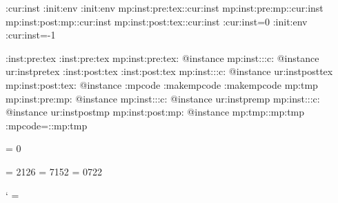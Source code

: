 \protected\def\newmetapostinstance{\withoptions[]\newmetapostinstance:}
\def\newmetapostinstance:[#1]#2{%
    \chardef#2=\directlua{
            tex.sprint(require('minim-mp').open{#1})
        }\relax}

\newcount \mp:cur:inst
\newtoks \mp:init:env \mp:init:env{%
    \expandafter\newtoks\csname mp:inst:pre:tex:\the\mp:cur:inst\endcsname
    \expandafter\newtoks\csname mp:inst:pre:mp:\the\mp:cur:inst\endcsname
    \expandafter\newtoks\csname mp:inst:post:mp:\the\mp:cur:inst\endcsname
    \expandafter\newtoks\csname mp:inst:post:tex:\the\mp:cur:inst\endcsname}
\mp:cur:inst=0 \the\mp:init:env \mp:cur:inst=-1

\def\everymp#1#2#3{\csname mp:inst:#2:#3:\the
    \ifcsname \string#1@instance\endcsname %
        \lastnamedcs\else\numexpr#1\fi
    \endcsname}

\newtoks\mp:inst:pre:tex \mp:inst:pre:tex{%
    \the\everymp0{pre}{tex}%
    \the\everymp\mp:cur:inst{pre}{tex}}
\newtoks\mp:inst:post:tex \mp:inst:post:tex{%
    \the\everymp\mp:cur:inst{post}{tex}%
    \the\everymp0{post}{tex}}
\newtoks\mp:mpcode %
\newtoks\mp:makempcode \mp:makempcode{%
    \edef\minim:mp:tmp{%
        \the\everymp0{pre}{mp}%
        \the\everymp\mp:cur:inst{pre}{mp}%
        \the\everymp\mp:cur:inst{post}{mp}%
        \the\everymp0{post}{mp}}%
    \edef\minim:mp:tmp{\minim:mp:tmp}%
    \mp:mpcode=\expandafter{\minim:mp:tmp}}

\newcount \convertmpcolours
\convertmpcolours = 0

\newcount\RtoG \RtoG = 2126
\newcount\GtoG \GtoG = 7152
\newcount\BtoG \BtoG = 0722

\newtoks \everymaketext
\def\mpdim#1{\the\dimexpr#1\relax}

\catcode`\: = \minimmploaded

